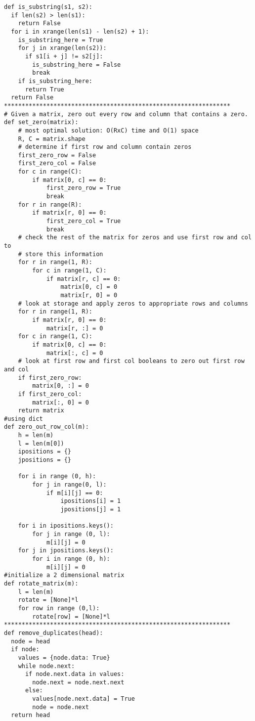 \documentclass[12pt]{article}
\begin{document}
\begin{lstlisting}
def is_substring(s1, s2):
  if len(s2) > len(s1):
    return False
  for i in xrange(len(s1) - len(s2) + 1):
    is_substring_here = True
    for j in xrange(len(s2)):
      if s1[i + j] != s2[j]:
        is_substring_here = False
        break
    if is_substring_here:
      return True
  return False
****************************************************************
# Given a matrix, zero out every row and column that contains a zero.
def set_zero(matrix):
    # most optimal solution: O(RxC) time and O(1) space
    R, C = matrix.shape
    # determine if first row and column contain zeros
    first_zero_row = False
    first_zero_col = False
    for c in range(C):
        if matrix[0, c] == 0:
            first_zero_row = True
            break
    for r in range(R):
        if matrix[r, 0] == 0:
            first_zero_col = True
            break
    # check the rest of the matrix for zeros and use first row and col to
    # store this information
    for r in range(1, R):
        for c in range(1, C):
            if matrix[r, c] == 0:
                matrix[0, c] = 0
                matrix[r, 0] = 0
    # look at storage and apply zeros to appropriate rows and columns
    for r in range(1, R):
        if matrix[r, 0] == 0:
            matrix[r, :] = 0
    for c in range(1, C):
        if matrix[0, c] == 0:
            matrix[:, c] = 0
    # look at first row and first col booleans to zero out first row and col
    if first_zero_row:
        matrix[0, :] = 0
    if first_zero_col:
        matrix[:, 0] = 0
    return matrix
#using dict
def zero_out_row_col(m):
    h = len(m)
    l = len(m[0])
    ipositions = {}
    jpositions = {}
    
    for i in range (0, h):
        for j in range(0, l):
            if m[i][j] == 0:
                ipositions[i] = 1
                jpositions[j] = 1
    
    for i in ipositions.keys():
        for j in range (0, l):
            m[i][j] = 0
    for j in jpositions.keys():
        for i in range (0, h):
            m[i][j] = 0
#initialize a 2 dimensional matrix
def rotate_matrix(m):
    l = len(m)
    rotate = [None]*l
    for row in range (0,l):
        rotate[row] = [None]*l
****************************************************************
def remove_duplicates(head):
  node = head
  if node:
    values = {node.data: True}
    while node.next:
      if node.next.data in values:
        node.next = node.next.next
      else:
        values[node.next.data] = True
        node = node.next
  return head


\end{lstlisting}
\end{document}
